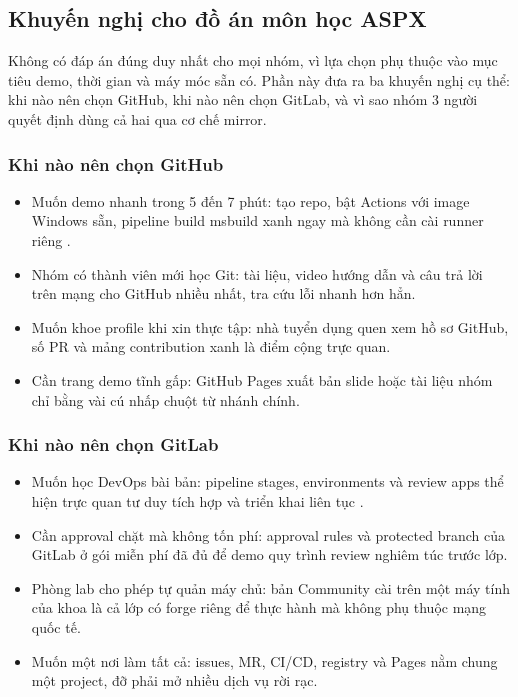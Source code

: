 \subsection{Khuyến nghị cho đồ án môn học ASPX}

Không có đáp án đúng duy nhất cho mọi nhóm, vì lựa chọn phụ thuộc vào mục tiêu demo,
thời gian và máy móc sẵn có.
Phần này đưa ra ba khuyến nghị cụ thể: khi nào nên chọn GitHub,
khi nào nên chọn GitLab, và vì sao nhóm 3 người quyết định dùng cả hai qua cơ chế mirror.

\subsubsection{Khi nào nên chọn GitHub}

\begin{itemize}
\item Muốn demo nhanh trong 5 đến 7 phút: tạo repo, bật Actions với image Windows sẵn,
  pipeline build msbuild xanh ngay mà không cần cài runner riêng \cite{ghactions,msmsbuild}.
\item Nhóm có thành viên mới học Git: tài liệu, video hướng dẫn và câu trả lời trên mạng
  cho GitHub nhiều nhất, tra cứu lỗi nhanh hơn hẳn.
\item Muốn khoe profile khi xin thực tập: nhà tuyển dụng quen xem hồ sơ GitHub,
  số PR và mảng contribution xanh là điểm cộng trực quan.
\item Cần trang demo tĩnh gấp: GitHub Pages xuất bản slide hoặc tài liệu nhóm
  chỉ bằng vài cú nhấp chuột từ nhánh chính.
\end{itemize}

\subsubsection{Khi nào nên chọn GitLab}

\begin{itemize}
\item Muốn học DevOps bài bản: pipeline stages, environments và review apps
  thể hiện trực quan tư duy tích hợp và triển khai liên tục \cite{gitlabci}.
\item Cần approval chặt mà không tốn phí: approval rules và protected branch của GitLab
  ở gói miễn phí đã đủ để demo quy trình review nghiêm túc trước lớp.
\item Phòng lab cho phép tự quản máy chủ: bản Community cài trên một máy tính
  của khoa là cả lớp có forge riêng để thực hành mà không phụ thuộc mạng quốc tế.
\item Muốn một nơi làm tất cả: issues, MR, CI/CD, registry và Pages nằm chung một project,
  đỡ phải mở nhiều dịch vụ rời rạc.
\end{itemize}

